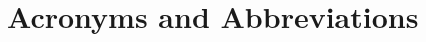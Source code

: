 
\markboth{}{\scshape \nomname}
\setlength{\nomlabelwidth}{3cm}
\printnomenclature



\newpage
\section*{Acronyms and Abbreviations}

\printacronyms[heading=none]

\newpage
